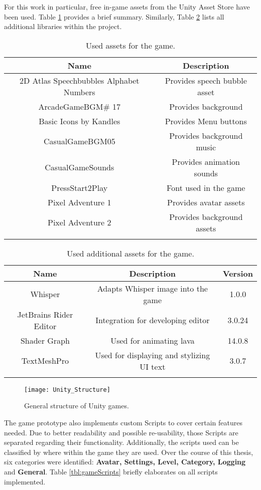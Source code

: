 \documentclass[draft,final]{vutinfth} %
\begin{document}
For this work in particular, free in-game assets from the Unity Asset Store \cite{unityStore} have been used. Table \ref{tbl:unityAssets} provides a brief summary. Similarly, Table \ref{tbl:unityLibraries} lists all additional libraries within the project.

\begin{longtable}[h]{|c|c|}
\hline
\textbf{Name} & \textbf{Description} \\  \hline
2D Atlas Speechbubbles  Alphabet Numbers \cite{assetSpeechBubble} & Provides speech bubble asset \\ \hline
ArcadeGameBGM\# 17 \cite{assetArcadeBGM} & Provides background  \\ \hline 
Basic Icons by Kandles \cite{assetBasicIcons}& Provides Menu buttons \\ \hline
CasualGameBGM05 \cite{assetCasualBGM}& Provides background  music \\ \hline
CasualGameSounds \cite{assetCasualGameSounds}& Provides animation sounds \\ \hline
PressStart2Play \cite{assetPressStart}& Font used in the game \\ \hline
Pixel Adventure 1 \cite{assetPixelAdventure1}& Provides avatar assets \\ \hline
Pixel Adventure 2 \cite{assetPixelAdventure1}& Provides background assets \\ \hline


\caption{Used assets for the game.}
\label{tbl:unityAssets}
\end{longtable}


\begin{longtable}[h]{|c|c|c|}
\hline
\textbf{Name} &  \textbf{Description}  & \textbf{Version}\\  \hline
Whisper & Adapts Whisper image into the game & 1.0.0 \\ \hline
JetBrains Rider Editor & Integration for developing editor & 3.0.24 \\ \hline
Shader Graph & Used for animating lava & 14.0.8 \\ \hline
TextMeshPro & Used for displaying and stylizing UI text & 3.0.7 \\ \hline


\caption{Used additional assets for the game.}
\label{tbl:unityLibraries}
\end{longtable}

\begin{figure}
  \centering
  \texttt{[image: Unity\_Structure]}
  \caption{General structure of Unity games.}
\end{figure}
The game prototype also implements custom Scripts to cover certain features needed. Due to better readability and possible re-usability, those Scripts are separated regarding their functionality. Additionally, the scripts used can be classified by where within the game they are used. Over the course of this thesis, six categories were identified: \textbf{Avatar, Settings, Level, Category, Logging } and \textbf{General}. Table \ref{tbl:gameScripts} briefly elaborates on all scripts implemented.
\end{document}
